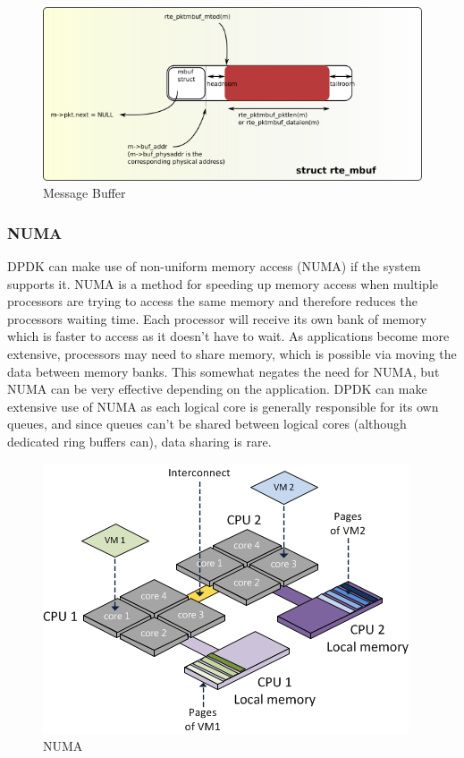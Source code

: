 \documentclass[final_report.tex]{subfiles}
\begin{document}
\begin{figure}[H]
	\centering
	\includegraphics[width=\textwidth]{img/mbuf.png}
	\caption{Message Buffer}
	\label{fig:mbuf}
\end{figure}

\subsubsection{NUMA}
DPDK can make use of non-uniform memory access (NUMA) if the system supports it. NUMA is a method for speeding up memory access when multiple processors are trying to access the same memory and therefore reduces the processors waiting time. Each processor will receive its own bank of memory which is faster to access as it doesn't have to wait. As applications become more extensive, processors may need to share memory, which is possible via moving the data between memory banks. This somewhat negates the need for NUMA, but NUMA can be very effective depending on the application. DPDK can make extensive use of NUMA as each logical core is generally responsible for its own queues, and since queues can't be shared between logical cores (although dedicated ring buffers can), data sharing is rare.

\begin{figure}[H]
	\centering
	\includegraphics[width=\textwidth/2]{img/numa.png}
	\caption{NUMA}
	\label{fig:numa}
\end{figure}
\end{document}
